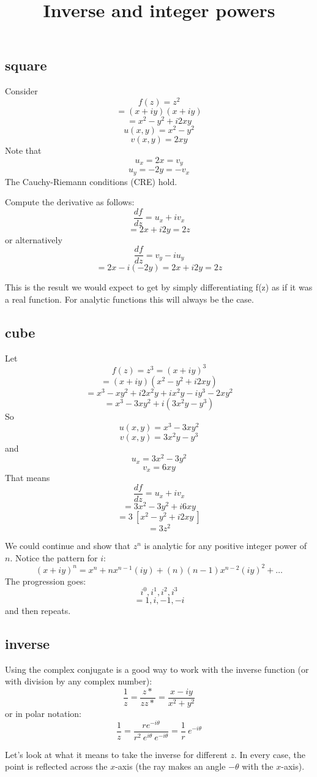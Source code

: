 \documentclass[11pt, oneside]{article}   	%
\title{Inverse and integer powers}
\date{}							%
\begin{document}
\maketitle
\Large
\subsection*{square}
Consider 
\[ f(z) = z^2 \]
\[ = (x + iy)(x + iy) \]
\[ = x^2 - y^2 + i2xy \]
\[ u(x,y) = x^2 - y^2 \]
\[ v(x,y) = 2xy \]
Note that
\[ u_x = 2x = v_y \]
\[ u_y = -2y = - v_x \]
The Cauchy-Riemann conditions (CRE) hold.

Compute the derivative as follows:
\[ \frac{df}{dz} = u_x + i v_x \]
\[ = 2x + i 2y = 2z \]
or alternatively
\[ \frac{df}{dz} = v_y - i u_y \]
\[ = 2x - i (-2y) = 2x + i2y = 2z \]

This is the result we would expect to get by simply differentiating f(z) as if it was a real function. For analytic functions this will always be the case.

\subsection*{cube}
Let
\[ f(z) = z^3 = (x + iy)^3 \]
\[ = (x + iy)(x^2 - y^2 + i2xy) \]
\[ = x^3 -xy^2 + i2x^2y + ix^2y -iy^3 - 2xy^2 \]
\[ = x^3 - 3xy^2 + i(3x^2y - y^3) \]
So
\[ u(x,y) = x^3 - 3xy^2 \]
\[ v(x,y) = 3x^2y - y^3 \]
and
\[ u_x = 3x^2 - 3y^2 \]
\[ v_x = 6xy \]
That means
\[ \frac{df}{dz} = u_x + i v_x \]
\[ = 3x^2 - 3y^2 + i 6xy \]
\[ = 3 \ [ x^2 - y^2 + i2xy \ ] \]
\[ = 3z^2 \]

We could continue and show that $z^n$ is analytic for any positive integer power of $n$.
Notice the pattern for $i$:
\[ (x + iy)^n = x^n + nx^{n-1}(iy) + (n)(n-1)x^{n-2}(iy)^2 + \dots \]
The progression goes:
\[ i^0, i^1, i^2, i^3 \]
\[ = 1, i, -1, -i \]
and then repeats.

\subsection*{inverse}
Using the complex conjugate is a good way to work with the inverse function (or with division by any complex number):
\[ \frac{1}{z} = \frac{z*}{zz*} = \frac{x - iy}{x^2 + y^2} \]
or in polar notation:
\[  \frac{1}{z} =  \frac{r e^{-i \theta}}{r^2 \ e^{i \theta} \ e^{-i \theta}} = \frac{1}{r} \ e^{-i \theta} \]

Let's look at what it means to take the inverse for different $z$.  In every case, the point is reflected across the $x$-axis (the ray makes an angle $- \theta$ with the $x$-axis).  
\end{document}

